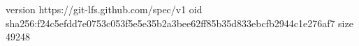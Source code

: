 version https://git-lfs.github.com/spec/v1
oid sha256:f24c5efdd7e0753c053f5e5e35b2a3bee62ff85b35d833ebcfb2944c1e276af7
size 49248
